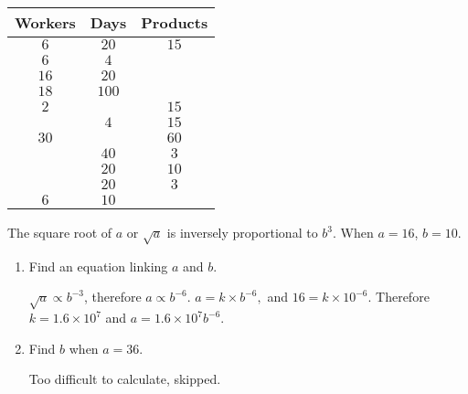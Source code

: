 \documentclass[8pt]{article}
\begin{document}
		\begin{center}
			\begin{tabular}{c|c|c}
				Workers & Days & Products\\
				\hline\hline
				\(6\) & \(20\) & \(15\)\\
				\hline
				\(6\) & \(4\) & \exmpword{\(3\)}\\
				\hline
				\(16\) & \(20\) & \exmpword{\(40\)}\\
				\hline
				\(18\) & \(100\) & \exmpword{\(225\)}\\
				\hline
				\(2\) & \exmpword{\(60\)} & \(15\)\\
				\hline
				\exmpword{\(30\)} & \(4\) & \(15\)\\
				\hline
				\(30\) & \exmpword{\(16\)} & \(60\)\\
				\hline
				\exmpword{\(0.6\)} & \(40\) & \(3\)\\
				\hline
				\exmpword{\(4\)} & \(20\) & \(10\)\\
				\hline
				\exmpword{\(1.2\)} & \(20\) & \(3\)\\
				\hline
				\(6\) & \(10\) & \exmpword{\(7.5\)}\\
			\end{tabular}
		\end{center}

	\prob The square root of \(a\) or \(\sqrt{a}\) is inversely proportional to \(b^3\). When \(a=16\), \(b=10\).

	\begin{enumerate}[label=\probword{(\arabic*)}]
		\item Find an equation linking \(a\) and \(b\).
		
		\solution \(\sqrt{a} \propto b^{-3}\), therefore \(a \propto b^{-6}\). \(a = k \times b^{-6},\) and \(16 = k \times 10^{-6}\). Therefore \(k = 1.6 \times 10^7\) and \(a = 1.6 \times 10^7 b^{-6}\).

		\item Find \(b\) when \(a=36\).
		
		\solution Too difficult to calculate, skipped.
	\end{enumerate}
\end{document}
